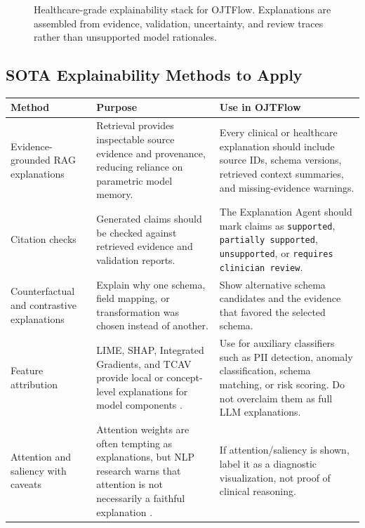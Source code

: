 \begin{figure}[H]
  \centering
  \resizebox{\textwidth}{!}{}
  \caption{Healthcare-grade explainability stack for OJTFlow. Explanations are assembled from evidence, validation, uncertainty, and review traces rather than unsupported model rationales.}
  \label{fig:medical-explainability}
\end{figure}

\subsection{SOTA Explainability Methods to Apply}

\begin{longtable}{p{}p{}p{}}
\toprule
\textbf{Method} & \textbf{Purpose} & \textbf{Use in OJTFlow} \\
\midrule
Evidence-grounded RAG explanations & Retrieval provides inspectable source evidence and provenance, reducing reliance on parametric model memory. & Every clinical or healthcare explanation should include source IDs, schema versions, retrieved context summaries, and missing-evidence warnings. \\
\addlinespace
Citation checks & Generated claims should be checked against retrieved evidence and validation reports. & The Explanation Agent should mark claims as \texttt{supported}, \texttt{partially supported}, \texttt{unsupported}, or \texttt{requires clinician review}. \\
\addlinespace
Counterfactual and contrastive explanations & Explain why one schema, field mapping, or transformation was chosen instead of another. & Show alternative schema candidates and the evidence that favored the selected schema. \\
\addlinespace
Feature attribution & LIME, SHAP, Integrated Gradients, and TCAV provide local or concept-level explanations for model components \cite{ribeiro2016lime,lundberg2017shap,sundararajan2017ig,kim2018tcav}. & Use for auxiliary classifiers such as PII detection, anomaly classification, schema matching, or risk scoring. Do not overclaim them as full LLM explanations. \\
\addlinespace
Attention and saliency with caveats & Attention weights are often tempting as explanations, but NLP research warns that attention is not necessarily a faithful explanation \cite{jain2019attention}. & If attention/saliency is shown, label it as a diagnostic visualization, not proof of clinical reasoning. \\

\end{longtable}
